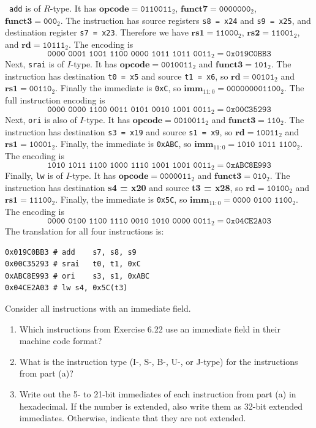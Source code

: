 \documentclass[12pt]{article}
\newenvironment{ex}[2][Exercise]{\begin{trivlist}
		\item[\hskip \labelsep {\bfseries #1}\hskip \labelsep {\bfseries #2.}]}{\end{trivlist}}
\newenvironment{sol}[1][Solution]{\begin{trivlist}
		\item[\hskip \labelsep {\bfseries #1:}]}{\end{trivlist}}
\begin{document}
\begin{sol}
	\
	\texttt{add} is of $R$-type. It has $\textbf{opcode}=\texttt{0110011}_2$,
	$\textbf{funct7}=\texttt{0000000}_2$, $\textbf{funct3}=\texttt{000}_2$.
	The instruction has source registers \texttt{s8 = x24} and \texttt{s9 = x25},
	and destination register \texttt{s7 = x23}. Therefore we have $\textbf{rs1}=
	\texttt{11000}_2$, $\textbf{rs2}=\texttt{11001}_2$, and $\textbf{rd}=\texttt{10111}_2$.
	The encoding is
	\[
	\texttt{0000 0001 1001 1100 0000 1011 1011 0011}_2=\texttt{0x019C0BB3}
	\]
	Next, \texttt{srai} is of $I$-type. It has $\textbf{opcode}=\texttt{0010011}_2$
	and $\textbf{funct3}=\texttt{101}_2$. The instruction has destination
	\texttt{t0 = x5} and source \texttt{t1 = x6}, so $\textbf{rd}=\texttt{00101}_2$
	and $\textbf{rs1}=\texttt{00110}_2$. Finally the immediate is \texttt{0xC},
	so $\textbf{imm}_{11:0}=\texttt{000000001100}_2$. The full instruction encoding is
	\[
	\texttt{0000 0000 1100 0011 0101 0010 1001 0011}_2=\texttt{0x00C35293}
	\]
	Next, \texttt{ori} is also of $I$-type. It has $\textbf{opcode}=\texttt{0010011}_2$
	and $\textbf{funct3}=\texttt{110}_2$. The instruction has destination
	\texttt{s3 = x19} and source \texttt{s1 = x9}, so $\textbf{rd}=\texttt{10011}_2$
	and $\textbf{rs1}=\texttt{10001}_2$. Finally, the immediate is \texttt{0xABC},
	so $\textbf{imm}_{11:0}=\texttt{1010 1011 1100}_2$. The encoding is
	\[
	\texttt{1010 1011 1100 1000 1110 1001 1001 0011}_2=\texttt{0xABC8E993}
	\]
	Finally, \texttt{lw} is of $I$-type. It has $\textbf{opcode}=\texttt{0000011}_2$
	and $\textbf{funct3}=\texttt{010}_2$. The instruction has destination
	\textbf{s4 = x20} and source \textbf{t3 = x28}, so $\textbf{rd}=\texttt{10100}_2$
	and $\textbf{rs1}=\texttt{11100}_2$. Finally, the immediate is \texttt{0x5C},
	so $\textbf{imm}_{11:0}=\texttt{0000 0100 1100}_2$. The encoding is
	\[
	\texttt{0000 0100 1100 1110 0010 1010 0000 0011}_2=\texttt{0x04CE2A03}
	\]
	The translation for all four instructions is:
	\begin{lstlisting}[language={}]
0x019C0BB3 # add	s7,	s8,	s9
0x00C35293 # srai	t0,	t1,	0xC
0xABC8E993 # ori	s3,	s1,	0xABC
0x04CE2A03 # lw	s4,	0x5C(t3)
	\end{lstlisting}
\end{sol}

\begin{ex}{6.24}
	Consider all instructions with an immediate field.
	\begin{enumerate}[label=(\alph*)]
		\item Which instructions from Exercise 6.22 use an immediate field in
		their machine code format?
		\item What is the instruction type (I-, S-, B-, U-, or J-type) for the
		instructions from part (a)?
		\item Write out the 5- to 21-bit  immediates of each instruction from part
		(a) in hexadecimal. If the number is extended, also write them as 32-bit
		extended immediates. Otherwise, indicate that they are not extended.
	\end{enumerate}
\end{ex}
\end{document}
